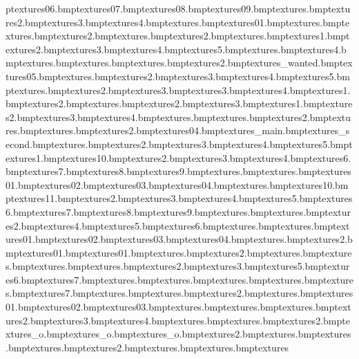 p textures\bandit06.bmp textures\bandit07.bmp textures\bandit08.bmp textures\bandit09.bmp textures\banner.bmp textures\banner2.bmp textures\banner3.bmp textures\banner4.bmp textures\pboard.bmp textures\bigcraneside01.bmp textures\blacktile.bmp textures\blueprint.bmp textures\blueprint2.bmp textures\bluewall.bmp textures\bluewall2.bmp textures\boltscrew.bmp textures\bombbit1.bmp textures\bombbit2.bmp textures\bombbit3.bmp textures\bombbit4.bmp textures\bombbit5.bmp textures\bonepicture.bmp textures\bridgesnow4.bmp textures\bucket.bmp textures\bucketmop.bmp textures\bulbbase.bmp textures\bulbbase2.bmp textures\bulb_wanted.bmp textures\cactus05.bmp textures\cake.bmp textures\cam2.bmp textures\cam3.bmp textures\cam4.bmp textures\cam5.bmp textures\cardbox.bmp textures\cardbox2.bmp textures\cardbox3.bmp textures\carpetblue3.bmp textures\carpetblue4.bmp textures\carpetred1.bmp textures\carpetred2.bmp textures\carpetredworn.bmp textures\carpetredworn2.bmp textures\carpetredworn3.bmp textures\cash1.bmp textures\cash2.bmp textures\cash3.bmp textures\cash4.bmp textures\ceiling.bmp textures\ceilingtiles.bmp textures\ceilingtiles2.bmp textures\chain.bmp textures\chess.bmp textures\chess2.bmp textures\citypave04.bmp textures\city_main.bmp textures\city_second.bmp textures\cleaner.bmp textures\cleaner2.bmp textures\cleaner3.bmp textures\cleaner4.bmp textures\cleaner5.bmp textures\clothes1.bmp textures\clothes10.bmp textures\clothes2.bmp textures\clothes3.bmp textures\clothes4.bmp textures\clothes6.bmp textures\clothes7.bmp textures\clothes8.bmp textures\clothes9.bmp textures\cloud.bmp textures\coin.bmp textures\coins01.bmp textures\coins02.bmp textures\coins03.bmp textures\coins04.bmp textures\companel.bmp textures\companel10.bmp textures\companel11.bmp textures\companel2.bmp textures\companel3.bmp textures\companel4.bmp textures\companel5.bmp textures\companel6.bmp textures\companel7.bmp textures\companel8.bmp textures\companel9.bmp textures\compkey.bmp textures\compmont.bmp textures\compmont2.bmp textures\compmont4.bmp textures\compmont5.bmp textures\compmont6.bmp textures\crate.bmp textures\cratesteel.bmp textures\crucher01.bmp textures\crucher02.bmp textures\crucher03.bmp textures\crucher04.bmp textures\crystal.bmp textures\crystal2.bmp textures\ctblue01.bmp textures\deptlight01.bmp textures\desktops.bmp textures\desktops2.bmp textures\directionquestion.bmp textures\dominoside.bmp textures\door.bmp textures\doorarch.bmp textures\doorarch2.bmp textures\doorarch3.bmp textures\doorarch5.bmp textures\doorarch6.bmp textures\doorarch7.bmp textures\doorarchbot.bmp textures\doorarchpillar.bmp textures\doorbig.bmp textures\doorgroove.bmp textures\dynamitepiccy.bmp textures\elechut7.bmp textures\entrance.bmp textures\entryblue.bmp textures\entryblue2.bmp textures\facemask.bmp textures\feather01.bmp textures\feather02.bmp textures\feather03.bmp textures\fineartmarb.bmp textures\floorboards.bmp textures\floorsteel.bmp textures\floorsteel2.bmp textures\floorsteel3.bmp textures\floorsteel4.bmp textures\floortiles.bmp textures\frontdoor.bmp textures\frontdoor2.bmp textures_o.bmp textures_o.bmp textures_o.bmp textures\piano2.bmp textures\piano.bmp textures\gramshine.bmp textures\gratting.bmp textures\gratting2.bmp textures\greencarpet.bmp textures\greengoldtiles.bmp textures\gre